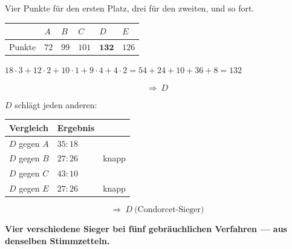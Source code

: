 \begin{merksatz}
Vier Punkte für den ersten Platz, drei für den zweiten, und so fort.
\begin{center}
{\small
\renewcommand{\arraystretch}{1.44}
\begin{tabular}{@{}P{1.2cm}P{1.4cm}P{1.4cm}P{1.4cm}P{1.4cm}P{1.4cm}@{}}
\toprule
& $A$ & $B$ & $C$ & $D$ & $E$\\
\midrule
Punkte & $72$ & $99$ & $101$ & $\mathbf{132}$ & $126$\\
\bottomrule
\end{tabular}}
\end{center}

 $18\cdot3 + 12\cdot2 + 10\cdot1 + 9\cdot4 + 4\cdot2 = 54+24+10+36+8 = 132$

\[ \Longrightarrow\ D \]

$D$ schlägt jeden anderen:
\begin{center}
{\small
\renewcommand{\arraystretch}{1.46}
\begin{tabular}{@{}P{2.0cm}P{2.0cm}P{2.6cm}@{}}
\toprule
\textbf{Vergleich} & \textbf{Ergebnis} & \\
\midrule
$D$ gegen $A$ & $35:18$ & \\
$D$ gegen $B$ & $27:26$ & knapp\\
$D$ gegen $C$ & $43:10$ & \\
$D$ gegen $E$ & $27:26$ & knapp\\
\bottomrule
\end{tabular}}
\end{center}
\[ \Longrightarrow\ D \ \text{(Condorcet-Sieger)} \]

\begin{center}
\begin{minipage}{0.9\textwidth}
\textbf{Vier verschiedene Sieger bei fünf gebräuchlichen Verfahren --- aus denselben Stimmzetteln.}
\end{minipage}
\end{center}

\begin{center}
\begin{minipage}{0.88\textwidth}
\end{minipage}
\end{center}
\end{merksatz}

